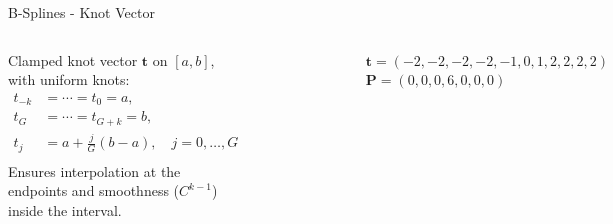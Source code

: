 \documentclass[aspectratio=169]{beamer}
\begin{document}
\begin{frame}{B-Splines - Knot Vector}
	
	\begin{columns}[T,onlytextwidth]
		
		
		Clamped knot vector $\mathbf{t}$ on $[a,b]$, with uniform knots:
		\begin{align*}
			t_{-k} &=\cdots=t_{0}=a,\\
			t_{G} &=\cdots=t_{G+k}=b,\\
			t_{j} &= a+\frac{j}{G}(b-a),\quad j=0,\dots,G\\
		\end{align*}
		Ensures interpolation at the endpoints and smoothness ($C^{k-1}$) inside the interval.
		
		\begin{figure}
			\centering
			\includegraphics[height=0.6\textheight]{../images/Cardinal_cubic_B-spline2.png}
		\end{figure}
		$\mathbf{t}=(-2, -2, -2, -2, -1, 0, 1, 2, 2, 2, 2)$\\
		$\mathbf{P}=(0, 0, 0, 6, 0, 0, 0)$
		
	\end{columns}
	
\end{frame}

\end{document}
